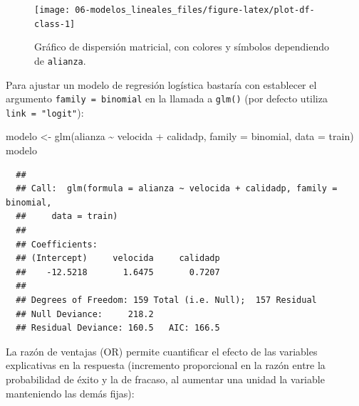 \documentclass[
]{book}
\newenvironment{Shaded}{\begin{snugshade}}{\end{snugshade}}
\newcommand{\AttributeTok}[1]{\textcolor[rgb]{0.77,0.63,0.00}{#1}}
\newcommand{\DecValTok}[1]{\textcolor[rgb]{0.00,0.00,0.81}{#1}}
\newcommand{\FunctionTok}[1]{\textcolor[rgb]{0.00,0.00,0.00}{#1}}
\newcommand{\NormalTok}[1]{#1}
\newcommand{\OtherTok}[1]{\textcolor[rgb]{0.56,0.35,0.01}{#1}}
\newcommand{\SpecialCharTok}[1]{\textcolor[rgb]{0.00,0.00,0.00}{#1}}
\theoremstyle{break}
\theoremstyle{nonumberplain}
\begin{document}
\begin{Shaded}
\end{Shaded}

\begin{figure}[!htb]

{\centering \texttt{[image: 06-modelos\_lineales\_files/figure-latex/plot-df-class-1]} 

}

\caption{Gráfico de dispersión matricial, con colores y símbolos dependiendo de \texttt{alianza}.}\label{fig:plot-df-class}
\end{figure}

Para ajustar un modelo de regresión logística bastaría con establecer el argumento \texttt{family\ =\ binomial} en la llamada a \texttt{glm()} (por defecto utiliza \texttt{link\ =\ "logit"}):

\begin{Shaded}
\begin{Highlighting}[]
\NormalTok{modelo }\OtherTok{\textless{}{-}} \FunctionTok{glm}\NormalTok{(alianza }\SpecialCharTok{\textasciitilde{}}\NormalTok{ velocida }\SpecialCharTok{+}\NormalTok{ calidadp, }\AttributeTok{family =}\NormalTok{ binomial, }\AttributeTok{data =}\NormalTok{ train)}
\NormalTok{modelo}
\end{Highlighting}
\end{Shaded}

\begin{verbatim}
  ## 
  ## Call:  glm(formula = alianza ~ velocida + calidadp, family = binomial, 
  ##     data = train)
  ## 
  ## Coefficients:
  ## (Intercept)     velocida     calidadp  
  ##    -12.5218       1.6475       0.7207  
  ## 
  ## Degrees of Freedom: 159 Total (i.e. Null);  157 Residual
  ## Null Deviance:     218.2 
  ## Residual Deviance: 160.5   AIC: 166.5
\end{verbatim}

La razón de ventajas (OR) permite cuantificar el efecto de las variables explicativas en la respuesta (incremento proporcional en la razón entre la probabilidad de éxito y la de fracaso, al aumentar una unidad la variable manteniendo las demás fijas):
\end{document}
